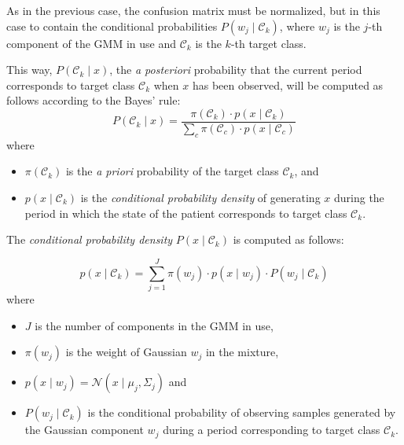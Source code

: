 \documentclass[a4paper,12pt]{article}
\begin{document}
\pagestyle{empty}

As in the previous case, the confusion matrix must be normalized, but in this case to contain the
conditional probabilities $P(w_j \mid \mathcal{C}_k)$,
where $w_j$ is the $j$-th component of the GMM in use and $\mathcal{C}_k$ is the $k$-th target class.

This way, $P(\mathcal{C}_k \mid x)$, the \emph{a posteriori} probability that
the current period corresponds to target class $\mathcal{C}_k$ when $x$ has been observed,
will be computed as follows according to the Bayes' rule:
\[
P(\mathcal{C}_k \mid x) = \frac{\pi(\mathcal{C}_k) \cdot p(x \mid \mathcal{C}_k)}{\sum_c \pi(\mathcal{C}_c) \cdot p(x \mid \mathcal{C}_c)}
\]
where
\begin{itemize}
\item
$\pi(\mathcal{C}_k)$ is the \emph{a priori} probability of the target class $\mathcal{C}_k$,
and

\item
$p(x \mid \mathcal{C}_k)$ is the \emph{conditional probability density}
of generating $x$ during the period in which the state of the patient
corresponds to target class $\mathcal{C}_k$.
\end{itemize}

\bigskip

The \emph{conditional probability density} $P(x \mid \mathcal{C}_k)$ is computed as follows:

\[
p(x \mid \mathcal{C}_k) = \sum_{j=1}^J \pi(w_j) \cdot p(x \mid w_j) \cdot P(w_j \mid \mathcal{C}_k)
\]
where
\begin{itemize}
\item
$J$ is the number of components in the GMM in use,

\item
$\pi(w_j)$ is the weight of Gaussian $w_j$ in the mixture,

\item
$p(x \mid w_j) = \mathcal{N}(x \mid \mu_{j}, \Sigma_{j})$ and

\item
$P(w_j \mid \mathcal{C}_k)$ is the conditional probability of observing
samples generated by the Gaussian component $w_j$ during a period corresponding
to target class $\mathcal{C}_k$.
\end{itemize}
\end{document}
